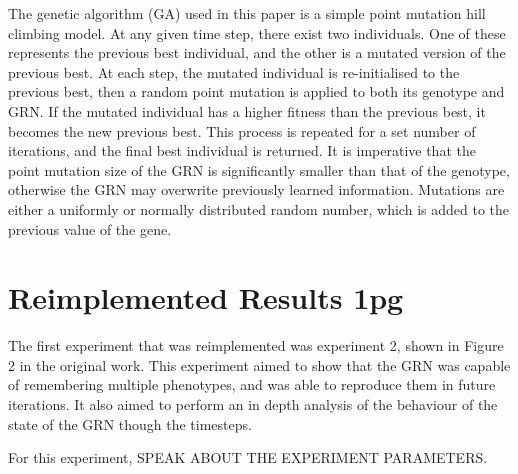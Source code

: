\documentclass[twocolumn,a4paper,12pt]{article}
\begin{document}
    The genetic algorithm (GA) used in this paper is a simple point mutation hill climbing model. At any given time step, there exist two individuals. One of these represents the previous best individual, and the other is a mutated version of the previous best. At each step, the mutated individual is re-initialised to the previous best, then a random point mutation is applied to both its genotype and GRN. If the mutated individual has a higher fitness than the previous best, it becomes the new previous best. This process is repeated for a set number of iterations, and the final best individual is returned. It is imperative that the point mutation size of the GRN is significantly smaller than that of the genotype, otherwise the GRN may overwrite previously learned information. Mutations are either a uniformly or normally distributed random number, which is added to the previous value of the gene.

    \section{Reimplemented Results 1pg}
    The first experiment that was reimplemented was experiment 2, shown in Figure 2 in the original work. This experiment aimed to show that the GRN was capable of remembering multiple phenotypes, and was able to reproduce them in future iterations. It also aimed to perform an in depth analysis of the behaviour of the state of the GRN though the timesteps.
    
    For this experiment, SPEAK ABOUT THE EXPERIMENT PARAMETERS.
\end{document}
